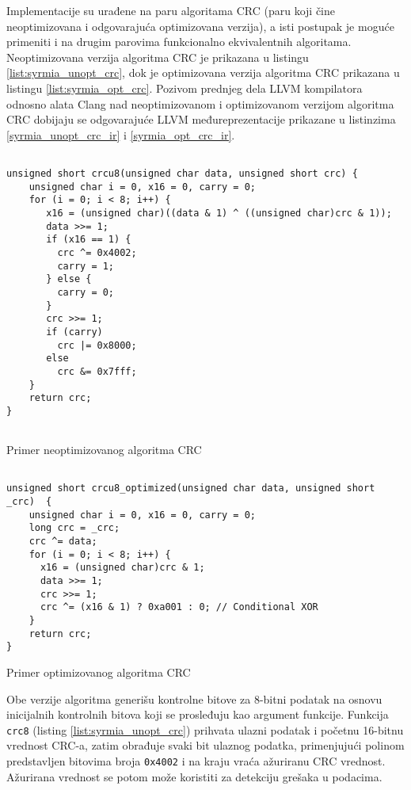 \documentclass[12pt,oneside]{memoir}
\begin{document}
Implementacije su urađene na paru algoritama CRC (paru koji čine neoptimizovana i odgovarajuća optimizovana verzija), a isti postupak je moguće primeniti i na drugim parovima funkcionalno ekvivalentnih algoritama. Neoptimizovana verzija algoritma CRC je prikazana u listingu \ref{list:syrmia_unopt_crc}, dok je optimizovana verzija algoritma CRC prikazana u listingu \ref{list:syrmia_opt_crc}. Pozivom prednjeg dela LLVM kompilatora odnosno alata Clang nad neoptimizovanom i optimizovanom verzijom algoritma CRC dobijaju se odgovarajuće LLVM međureprezentacije prikazane u listinzima \ref{syrmia_unopt_crc_ir} i \ref{syrmia_opt_crc_ir}. 

\begin{listing}
\begin{verbatim}

unsigned short crcu8(unsigned char data, unsigned short crc) {
    unsigned char i = 0, x16 = 0, carry = 0;
    for (i = 0; i < 8; i++) {
       x16 = (unsigned char)((data & 1) ^ ((unsigned char)crc & 1));
       data >>= 1;
       if (x16 == 1) {
         crc ^= 0x4002;
         carry = 1;
       } else {
         carry = 0;
       } 
       crc >>= 1;
       if (carry)
         crc |= 0x8000;
       else
         crc &= 0x7fff;
    }
    return crc;
}
    
\end{verbatim}
\caption{Primer neoptimizovanog algoritma CRC}
\label{list:syrmia_unopt_crc}
\centering
\end{listing}

\begin{listing}
\begin{verbatim}

unsigned short crcu8_optimized(unsigned char data, unsigned short _crc)  {
    unsigned char i = 0, x16 = 0, carry = 0;
    long crc = _crc;
    crc ^= data;
    for (i = 0; i < 8; i++) {
      x16 = (unsigned char)crc & 1;
      data >>= 1;
      crc >>= 1;
      crc ^= (x16 & 1) ? 0xa001 : 0; // Conditional XOR
    }
    return crc;
}

\end{verbatim}
\caption{Primer optimizovanog algoritma CRC}
\label{list:syrmia_opt_crc}
\centering
\end{listing}

Obe verzije algoritma generišu kontrolne bitove za 8-bitni podatak na osnovu inicijalnih kontrolnih bitova koji se prosleđuju kao argument funkcije.
Funkcija \texttt{crc8} (listing \ref{list:syrmia_unopt_crc}) prihvata ulazni podatak i početnu 16-bitnu vrednost CRC-a, zatim obrađuje svaki bit ulaznog podatka, primenjujući polinom predstavljen bitovima broja \texttt{0x4002} i na kraju vraća ažuriranu CRC vrednost. Ažurirana vrednost se potom može koristiti za detekciju grešaka u podacima.
\end{document}
